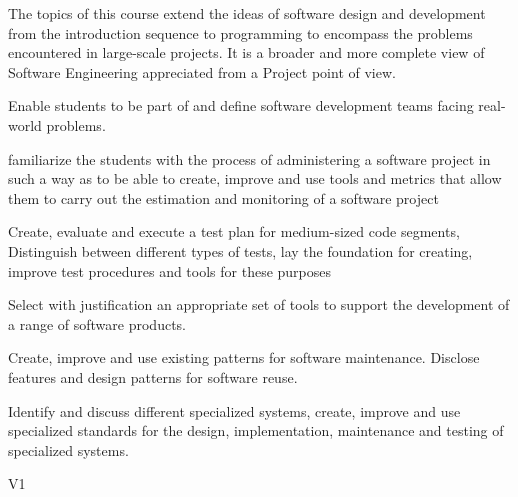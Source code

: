 \begin{syllabus}


\begin{justification}
The topics of this course extend the ideas of software design and development from the introduction sequence to programming to encompass the problems encountered in large-scale projects. 
It is a broader and more complete view of Software Engineering appreciated from a Project point of view.
\end{justification}

\begin{goals}
\item Enable students to be part of and define software development teams facing real-world problems.
\item familiarize the students with the process of administering a software project in such a way as to be able to create, improve and use tools and metrics that allow them to carry out the estimation and monitoring of a software project
\item Create, evaluate and execute a test plan for medium-sized code segments, Distinguish between different types of tests, lay the foundation for creating, improve test procedures and tools for these purposes
\item Select with justification an appropriate set of tools to support the development of a range of software products.
\item Create, improve and use existing patterns for software maintenance. Disclose features and design patterns for software reuse.
\item Identify and discuss different specialized systems, create, improve and use specialized standards for the design, implementation, maintenance and testing of specialized systems.
\end{goals}

\begin{outcomes}{V1}
    \item {}
    \item {}
    \item {}
    \item {}
    \item {}
\end{outcomes}


\end{syllabus}
